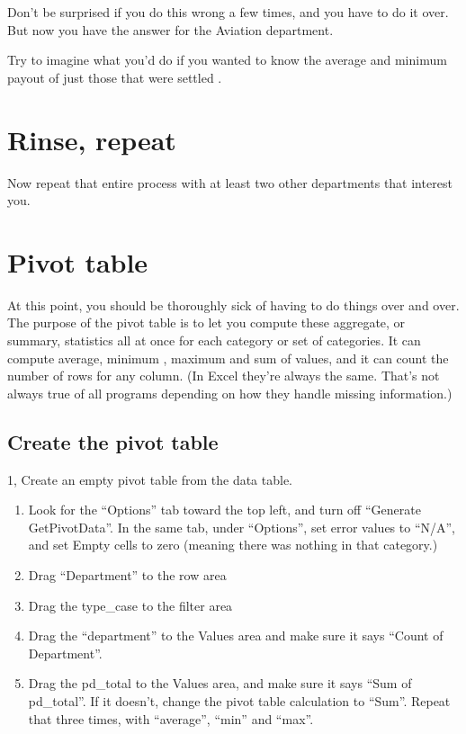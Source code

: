 \documentclass[
  letterpaper,
  DIV=11,
  numbers=noendperiod]{scrreprt}
\begin{document}
Don't be surprised if you do this wrong a few times, and you have to do
it over. But now you have the answer for the Aviation department.

Try to imagine what you'd do if you wanted to know the average and
minimum payout of just those that were settled .

\hypertarget{rinse-repeat}{%
\section{Rinse, repeat}\label{rinse-repeat}}

Now repeat that entire process with at least two other departments that
interest you.

\hypertarget{pivot-table}{%
\section{Pivot table}\label{pivot-table}}

At this point, you should be thoroughly sick of having to do things over
and over. The purpose of the pivot table is to let you compute these
aggregate, or summary, statistics all at once for each category or set
of categories. It can compute average, minimum , maximum and sum of
values, and it can count the number of rows for any column. (In Excel
they're always the same. That's not always true of all programs
depending on how they handle missing information.)

\hypertarget{create-the-pivot-table}{%
\subsection{Create the pivot table}\label{create-the-pivot-table}}

1, Create an empty pivot table from the data table.

\begin{enumerate}
\def\labelenumi{\arabic{enumi}.}
\setcounter{enumi}{1}
\item
  Look for the ``Options'' tab toward the top left, and turn off
  ``Generate GetPivotData''. In the same tab, under ``Options'', set
  error values to ``N/A'', and set Empty cells to zero (meaning there
  was nothing in that category.)
\item
  Drag ``Department'' to the row area
\item
  Drag the type\_case to the filter area
\item
  Drag the ``department'' to the Values area and make sure it says
  ``Count of Department''.
\item
  Drag the pd\_total to the Values area, and make sure it says ``Sum of
  pd\_total''. If it doesn't, change the pivot table calculation to
  ``Sum''. Repeat that three times, with ``average'', ``min'' and
  ``max''.
\end{enumerate}
\end{document}

